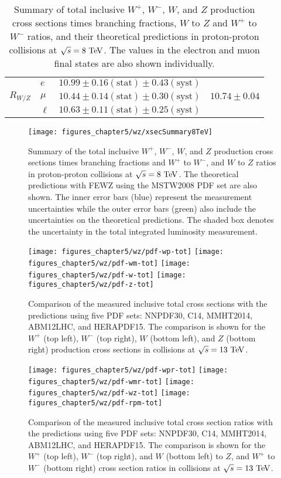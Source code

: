 \begin{table}[tbhp]
\begin {tabular} {lllr}
\hline
             & $e$   & $10.99 \pm 0.16\mathrm{(stat)}\pm 0.43\mathrm{(syst)}$ &                  \\
$R_{W/Z}$   & $\mu$ & $10.44 \pm 0.14\mathrm{(stat)}\pm 0.30\mathrm{(syst)}$ & $10.74 \pm 0.04$ \\
             & $\ell$ & $10.63 \pm 0.11\mathrm{(stat)}\pm 0.25\mathrm{(syst)}$ &  \\
\end{tabular}
\caption{ \label{tab:8tevtable}
Summary of total inclusive $W^{+}$, $W^{-}$, $W$, and $Z$ production cross sections times
branching fractions, $W$ to $Z$ and $W^{+}$ to $W^{-}$ ratios, and their theoretical predictions in proton-proton collisions at $\sqrt{s}=8~\mathrm{Te\kern -0.1em V}$. The values in the electron and muon final states are also shown individually.}
\end{table}
\begin{figure}[tbh]
\centering
\texttt{[image: figures\_chapter5/wz/xsecSummary8TeV]}
\caption{Summary of the total inclusive $W^+$, $W^-$, $W$, and $Z$ production cross sections times branching fractions and $W^+$ to $W^-$, and $W$ to $Z$ ratios in proton-proton collisions at $\sqrt{s}=8~\mathrm{Te\kern -0.1em V}$. The theoretical predictions with FEWZ using the MSTW2008 PDF set are also shown. The inner error bars (blue) represent the measurement uncertainties while the outer error bars (green) also include the uncertainties on the theoretical predictions. The shaded box denotes the uncertainty in the total integrated luminosity measurement.}
\label{fig:8tev}
\end{figure}
\begin{figure}[tbh]
\centering
\texttt{[image: figures\_chapter5/wz/pdf-wp-tot]}
\texttt{[image: figures\_chapter5/wz/pdf-wm-tot]}
\texttt{[image: figures\_chapter5/wz/pdf-w-tot]}
\texttt{[image: figures\_chapter5/wz/pdf-z-tot]}
\caption{Comparison of the measured inclusive total cross sections with the predictions using five PDF sets: NNPDF30, C14, MMHT2014, ABM12LHC, and HERAPDF15. The comparison is shown for the $W^+$ (top left), $W^-$ (top right), $W$ (bottom left), and $Z$ (bottom right) production cross sections in collisions at $\sqrt{s}=13~\mathrm{Te\kern -0.1em V}$.}
\label{fig:pdf_tot}
\end{figure}
\begin{figure}[tbh]
\centering
\texttt{[image: figures\_chapter5/wz/pdf-wpr-tot]}
\texttt{[image: figures\_chapter5/wz/pdf-wmr-tot]}
\texttt{[image: figures\_chapter5/wz/pdf-wz-tot]}
\texttt{[image: figures\_chapter5/wz/pdf-rpm-tot]}
\caption{Comparison of the measured inclusive total cross section ratios with the predictions using five PDF sets: NNPDF30, C14, MMHT2014, ABM12LHC, and HERAPDF15. The comparison is shown for the $W^+$ (top left), $W^-$ (top right), and $W$ (bottom left) to $Z$, and $W^+$ to $W^-$ (bottom right) cross section ratios in collisions at $\sqrt{s}=13~\mathrm{Te\kern -0.1em V}$.}
\label{fig:pdf_rat}
\end{figure}

